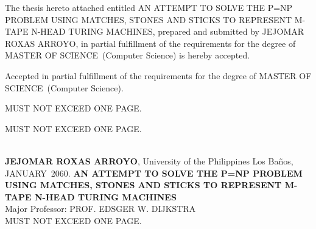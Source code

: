 \documentclass{icsthesis}
\renewcommand{\TITLE}{AN ATTEMPT TO SOLVE THE P=NP PROBLEM USING MATCHES, STONES AND STICKS TO REPRESENT M-TAPE N-HEAD TURING MACHINES}
\renewcommand{\AUTHOR}{JEJOMAR ROXAS ARROYO}
\renewcommand{\DEGREE}{MASTER OF SCIENCE}
\renewcommand{\MAJOR}{Computer Science}
\renewcommand{\MONTH}{JANUARY}
\renewcommand{\YEAR}{2060}
\begin{document}
	
	\begin{frontmatter}
		\maketitle
				
		\begin{approvalpage}
			The thesis hereto attached entitled \TITLE , prepared and submitted by \AUTHOR , in partial fulfillment of the requirements for the degree of \DEGREE\ (\MAJOR) is hereby accepted.
			
			\begin{multicols}{2}
				\centering
				\columnbreak
			\end{multicols}
			
			Accepted in partial fulfillment of the requirements for the degree of \DEGREE\ (\MAJOR). 
		\end{approvalpage}
		
		\begin{biosketch}
			\lipsum[4] %
			
			MUST NOT EXCEED ONE PAGE.		
			
			\addauthorsignaturefield
		\end{biosketch}	
		
		\begin{acknowledgement}
			\lipsum[4]
			\lipsum[4]
			\lipsum[4]
			MUST NOT EXCEED ONE PAGE.
		\end{acknowledgement}
		
		\maketableofcontents
		
		\makelistoftables

		\makelistoffigures
	
		
		\begin{abstractwithpageno}	
		\\
		\textbf{\AUTHOR}, University of the Philippines Los Ba\~{n}os, \MONTH\ \YEAR. \textbf{\TITLE}
		\\Major Professor: PROF. EDSGER W. DIJKSTRA\\
			
			\lipsum[4]MUST NOT EXCEED ONE PAGE.
		\end{abstractwithpageno}

	\end{frontmatter}
	
\end{document}
